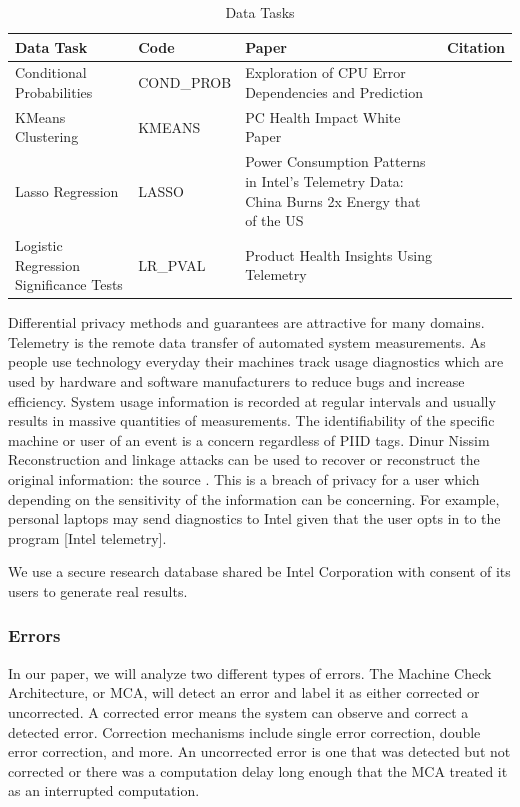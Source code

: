 \documentclass[12pt,letterpaper]{article}
\begin{document}
\begin{table}[h]%
\begin{center}
\caption{Data Tasks}
\label{tab:DataTasks}
\begin{tabular}{|p{4.5cm}|p{2.5cm}|p{5cm}|p{2.7cm}|}
\hline
Data Task & Code & Paper & Citation \\
\hline
Conditional Probabilities & COND\_PROB & Exploration of CPU Error Dependencies and Prediction & \cite{Kwasnick2023} \\
\hline
KMeans Clustering & KMEANS & PC Health Impact White Paper & \cite{kmeans} \\
\hline
Lasso Regression & LASSO & Power Consumption Patterns in Intel’s Telemetry Data: China Burns 2x Energy that of the US & \cite{lassocarbon} \\
\hline
Logistic Regression Significance Tests & LR\_PVAL & Product Health Insights Using Telemetry & \cite{prodhealLR} \\
\hline
\end{tabular}
\end{center}
\end{table}

Differential privacy methods and guarantees are attractive for many domains. Telemetry is the remote data transfer of automated system measurements. As people use technology everyday their machines track usage diagnostics which are used by hardware and software manufacturers to reduce bugs and increase efficiency. System usage information is recorded at regular intervals and usually results in massive quantities of measurements. The identifiability of the specific machine or user of an event is a concern regardless of PIID tags. Dinur Nissim Reconstruction and linkage attacks can be used to recover or reconstruct the original information: the source \cite{DinurReconstruction}. This is a breach of privacy for a user which depending on the sensitivity of the information can be concerning. For example, personal laptops may send diagnostics to Intel given that the user opts in to the program [Intel telemetry]. 

We use a secure research database shared be Intel Corporation with consent of its users to generate real results.

\subsubsection{Errors}

In our paper, we will analyze two different types of errors. The Machine Check Architecture, or MCA, will detect an error and label it as either corrected or uncorrected. A corrected error means the system can observe and correct a detected error. Correction mechanisms include single error correction, double error correction, and more. An uncorrected error is one that was detected but not corrected or there was a computation delay long enough that the MCA treated it as an interrupted computation. \cite{Kwasnick2023}
\end{document}
